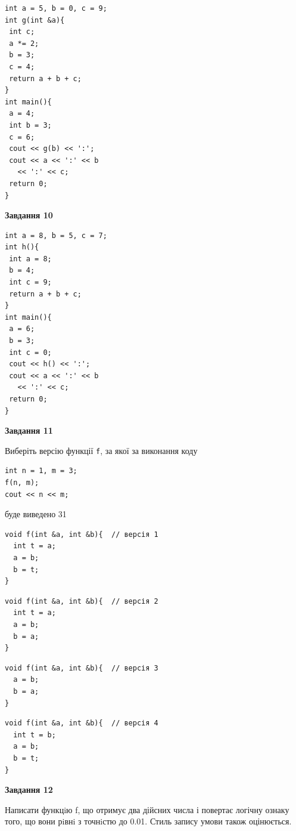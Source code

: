 \documentclass[12pt, ukrainian]{article}
\def\code#1{\Verb!#1!}
\begin{document}
{\begin {large}
\begin{minipage}[t]{7.0cm}
\begin{verbatim}
int a = 5, b = 0, c = 9;
int g(int &a){
 int c;
 a *= 2;
 b = 3;
 c = 4;
 return a + b + c;
}
int main(){
 a = 4;
 int b = 3;
 c = 6;
 cout << g(b) << ':';
 cout << a << ':' << b 
   << ':' << c;
 return 0;
}
\end{verbatim}



\begin{center}
\textbf{Завдання 10}
\end{center}
\vspace{-8mm}

\begin{verbatim}
int a = 8, b = 5, c = 7;
int h(){
 int a = 8;
 b = 4;
 int c = 9;
 return a + b + c;
}
int main(){
 a = 6;
 b = 3;
 int c = 0;
 cout << h() << ':';
 cout << a << ':' << b 
   << ':' << c;
 return 0;
}
\end{verbatim}

\end{minipage}
\vline \hspace{1mm}
\begin{minipage}[t]{11.0cm}

\begin{center}
\textbf{Завдання 11}
\end{center}
Виберіть версію функції \code{f}, за якої за виконання коду
\begin{verbatim}
int n = 1, m = 3;
f(n, m);
cout << n << m;
\end{verbatim}

буде виведено 31

\begin{verbatim}
void f(int &a, int &b){  // версія 1
  int t = a;
  a = b;
  b = t;
}
\end{verbatim}

\vspace{-8mm}\begin{verbatim}
void f(int &a, int &b){  // версія 2
  int t = a;
  a = b;
  b = a;
}
\end{verbatim}

\vspace{-8mm}\begin{verbatim}
void f(int &a, int &b){  // версія 3
  a = b;
  b = a;
}
\end{verbatim}

\vspace{-8mm}\begin{verbatim}
void f(int &a, int &b){  // версія 4
  int t = b;
  a = b;
  b = t;
}
\end{verbatim}



\begin{center}
\textbf{Завдання 12}
\end{center}

Написати функцiю f, що отримує два дійсних числа і повертає логічну ознаку того, що вони рiвнi з точнiстю до 0.01. Стиль запису умови також оцінюється.\par

\end{minipage}

\end {large}}
\newpage
\end{document}
